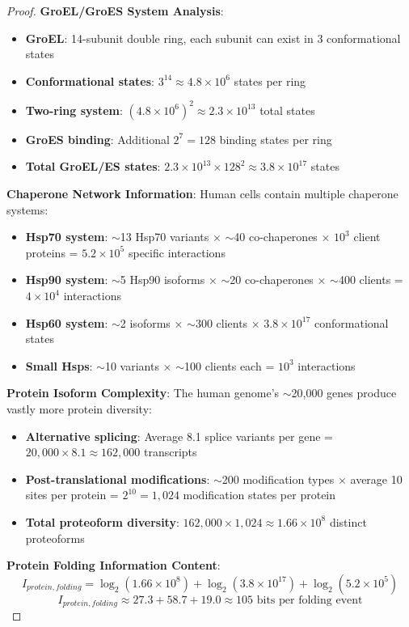 \documentclass[12pt,a4paper]{article}
\begin{document}
\begin{proof}
\textbf{GroEL/GroES System Analysis}:
\begin{itemize}
\item \textbf{GroEL}: 14-subunit double ring, each subunit can exist in 3 conformational states
\item \textbf{Conformational states}: $3^{14} \approx 4.8 \times 10^6$ states per ring
\item \textbf{Two-ring system}: $(4.8 \times 10^6)^2 \approx 2.3 \times 10^{13}$ total states
\item \textbf{GroES binding}: Additional $2^7 = 128$ binding states per ring
\item \textbf{Total GroEL/ES states}: $2.3 \times 10^{13} \times 128^2 \approx 3.8 \times 10^{17}$ states
\end{itemize}

\textbf{Chaperone Network Information}: Human cells contain multiple chaperone systems:
\begin{itemize}
\item \textbf{Hsp70 system}: $\sim$13 Hsp70 variants × $\sim$40 co-chaperones × $10^3$ client proteins = $5.2 \times 10^5$ specific interactions
\item \textbf{Hsp90 system}: $\sim$5 Hsp90 isoforms × $\sim$20 co-chaperones × $\sim$400 clients = $4 \times 10^4$ interactions  
\item \textbf{Hsp60 system}: $\sim$2 isoforms × $\sim$300 clients × $3.8 \times 10^{17}$ conformational states
\item \textbf{Small Hsps}: $\sim$10 variants × $\sim$100 clients each = $10^3$ interactions
\end{itemize}

\textbf{Protein Isoform Complexity}: The human genome's $\sim$20,000 genes produce vastly more protein diversity:
\begin{itemize}
\item \textbf{Alternative splicing}: Average 8.1 splice variants per gene = $20,000 \times 8.1 \approx 162,000$ transcripts
\item \textbf{Post-translational modifications}: $\sim$200 modification types × average 10 sites per protein = $2^{10} = 1,024$ modification states per protein
\item \textbf{Total proteoform diversity}: $162,000 \times 1,024 \approx 1.66 \times 10^8$ distinct proteoforms
\end{itemize}

\textbf{Protein Folding Information Content}:
\begin{equation}
I_{protein,folding} = \log_2(1.66 \times 10^8) + \log_2(3.8 \times 10^{17}) + \log_2(5.2 \times 10^5)
\end{equation}
\begin{equation}
I_{protein,folding} \approx 27.3 + 58.7 + 19.0 \approx 105 \text{ bits per folding event}
\end{equation}


\end{proof}
\end{document}
